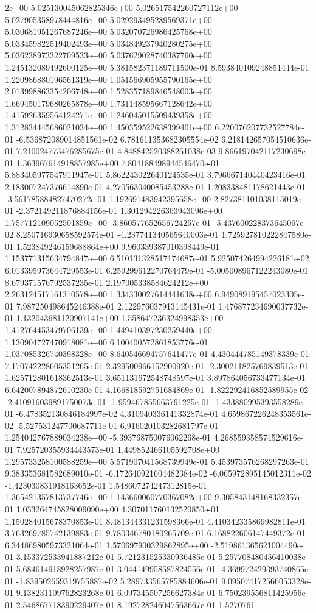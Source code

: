 2e+00	5.025130045062825346e+00	5.026517542260727112e+00	5.027905358978444816e+00	5.029293495289569371e+00	5.030681951267687246e+00	5.032070726986425768e+00	5.033459822519402493e+00	5.034849237940280275e+00	5.036238973322709533e+00	5.037629028740387760e+00
1.245132089492600125e+00	5.381582371189711500e-01	8.593840109248851444e-01	1.220986880196561319e+00	1.051566905955790165e+00	2.013998863354206748e+00	1.528357189846548003e+00	1.669450179680265878e+00	1.731148595667128642e+00	1.415926359564124271e+00	1.246045015509439358e+00	1.312834445686021034e+00	1.450359522638399401e+00	6.220076207732527784e-01	-6.536872089014851561e-02	6.781611353682305554e-02	6.218142657054510636e-01	7.210024773476285675e-01	4.848842520388261038e-03	9.866197042117230698e-01	1.363967614918857985e+00	7.804188498944546470e-01	5.883405977547911947e-01	5.862243022640124535e-01	3.796667140440423416e-01	2.183007247376614890e-01	4.270563040085453288e-01	1.208338481178621443e-01	-3.561785884827470272e-01	1.192691483942395658e+00	2.827381101038115019e-01	-2.372149211876884156e-01	1.301294226363943096e+00	1.757712109052501859e+00	-3.860577652656724257e-01	-5.437600228373645067e-02	8.250716930658592574e-01	-4.237741340565640003e-01	1.725927810222847580e-01	1.523849246159688864e+00	9.960339387010398449e-01	1.153771315634794847e+00	6.510131328517174687e-01	5.925074264994226181e-02	6.013395973644729553e-01	6.259299612270764479e-01	-5.005008967122243080e-01	8.679371576792537235e-01	2.197005338584624212e+00	2.263124517161310578e+00	1.334330027614441638e+00	6.949089195457023305e-01	7.987250498645246388e-01	2.122976037913145431e-01	1.476877234690037732e-01	1.132043681120907141e+00	1.558647236324998353e+00	1.412764453479706139e+00	1.449410397230259440e+00	1.130904727470918081e+00	6.100400572861853776e-01	1.037085326740398328e+00	8.640546694757641477e-01	4.430444785149378339e-01	7.170742228605351265e-01	2.329500966152900920e-01	-2.300211825769839513e-01	1.625712801618362513e-01	3.651131672548748597e-01	3.897864056733477134e-01	6.642007894872610230e-01	4.166818592751684869e-01	-1.822292416852589955e-02	-2.410916039891750073e-01	-1.959467855663791225e-01	-1.433880995393558289e-01	-6.478352130846184997e-02	4.310940336141332874e-01	4.659867226248353561e-02	-5.527531247700687711e-01	6.916020103282681797e-01	1.254042767889034238e+00	-5.393768750076062268e-01	4.268559358574529616e-01	7.925720355934443573e-01	1.449852466105592708e+00	1.295733258100588259e+00	5.571907041568739949e-01	5.453973576268297263e-01	9.383353681582689010e-01	-6.172640921604482384e-02	-6.065972895145012311e-02	-1.423030831918163652e-01	1.548607274247312815e-01	1.365421357813737746e+00	1.143660060770367082e+00	9.305843148168332357e-01	1.033264745828009090e+00	4.307011760132520850e-01	1.150284015678370853e-01	8.481344331231598366e-01	4.410342335869982811e-01	3.763269785742139883e-01	9.780346780180265709e-01	6.168822606147449372e-01	6.344869805973321064e-01	1.570697900329862895e+00	-2.519861365621004490e-01	3.153372533941887212e-01	5.721231525330936485e-01	5.257708480456410038e-01	5.684614918928257987e-01	3.044149958587824556e-01	-4.369972429393740865e-01	-1.839502659319755887e-02	5.289733565785884606e-01	9.095074172566053328e-01	9.138231109762823268e-01	6.097345507256627384e-01	6.750239556811425956e-01	2.546867718390229407e-01	8.192728246047563667e-01	1.5270761